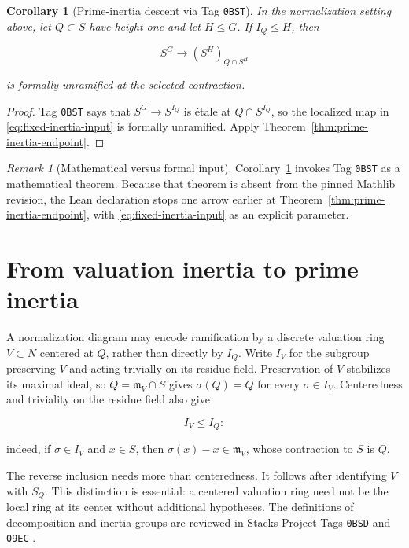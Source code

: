 \documentclass[11pt]{article}
\newtheorem{corollary}[theorem]{Corollary}
\theoremstyle{remark}
\newtheorem*{remark}{Remark}
\newcommand{\m}{\mathfrak m}
\begin{document}
\begin{corollary}[Prime-inertia descent via Tag \texttt{0BST}]
\label{cor:prime-inertia-stacks}
In the normalization setting above, let \(Q\subset S\) have height one and
let \(H\leq G\).  If \(I_Q\leq H\), then

\[
  S^G\longrightarrow (S^H)_{Q\cap S^H}
\]

is formally unramified at the selected contraction.
\end{corollary}

\begin{proof}
Tag \texttt{0BST} says that \(S^G\to S^{I_Q}\) is \'etale at
\(Q\cap S^{I_Q}\), so the localized map in
\eqref{eq:fixed-inertia-input} is formally unramified.  Apply
Theorem~\ref{thm:prime-inertia-endpoint}.
\end{proof}

\begin{remark}[Mathematical versus formal input]
Corollary~\ref{cor:prime-inertia-stacks} invokes Tag \texttt{0BST} as a
mathematical theorem.  Because that theorem is absent from the pinned
Mathlib revision, the Lean declaration stops one arrow earlier at
Theorem~\ref{thm:prime-inertia-endpoint}, with
\eqref{eq:fixed-inertia-input} as an explicit parameter.
\end{remark}

\section{From valuation inertia to prime inertia}
\label{sec:valuation}

A normalization diagram may encode ramification by a discrete valuation
ring \(V\subset N\) centered at \(Q\), rather than directly by \(I_Q\).
Write \(I_V\) for the subgroup preserving \(V\) and acting trivially on its
residue field.  Preservation of \(V\) stabilizes its maximal ideal, so
\(Q=\m_V\cap S\) gives \(\sigma(Q)=Q\) for every \(\sigma\in I_V\).
Centeredness and triviality on the residue field also give

\[
  I_V\leq I_Q:
\]

indeed, if \(\sigma\in I_V\) and \(x\in S\), then
\(\sigma(x)-x\in\m_V\), whose contraction to \(S\) is \(Q\).

The reverse inclusion needs more than centeredness.  It follows after
identifying \(V\) with \(S_Q\).  This distinction is essential: a centered
valuation ring need not be the local ring at its center without additional
hypotheses.  The definitions of decomposition and inertia groups are
reviewed in Stacks Project Tags \texttt{0BSD} and \texttt{09EC}
\cite{StacksRamificationTheory,StacksDVRInertiaDefinition}.
\end{document}
